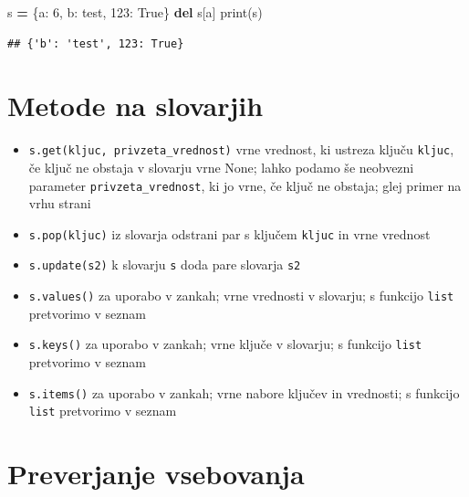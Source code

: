 \documentclass[
]{report}
\newenvironment{Shaded}{\begin{snugshade}}{\end{snugshade}}
\newcommand{\BuiltInTok}[1]{#1}
\newcommand{\DecValTok}[1]{\textcolor[rgb]{0.00,0.00,0.81}{#1}}
\newcommand{\KeywordTok}[1]{\textcolor[rgb]{0.13,0.29,0.53}{\textbf{#1}}}
\newcommand{\NormalTok}[1]{#1}
\newcommand{\OperatorTok}[1]{\textcolor[rgb]{0.81,0.36,0.00}{\textbf{#1}}}
\newcommand{\StringTok}[1]{\textcolor[rgb]{0.31,0.60,0.02}{#1}}
\newcommand{\VariableTok}[1]{\textcolor[rgb]{0.00,0.00,0.00}{#1}}
\providecommand{\tightlist}{%
  \setlength{\itemsep}{0pt}\setlength{\parskip}{0pt}}
\begin{document}
\begin{Shaded}
\begin{Highlighting}[]
\NormalTok{s }\OperatorTok{=}\NormalTok{ \{}\StringTok{\textquotesingle{}a\textquotesingle{}}\NormalTok{: }\DecValTok{6}\NormalTok{, }\StringTok{\textquotesingle{}b\textquotesingle{}}\NormalTok{: }\StringTok{\textquotesingle{}test\textquotesingle{}}\NormalTok{, }\DecValTok{123}\NormalTok{: }\VariableTok{True}\NormalTok{\}}
\KeywordTok{del}\NormalTok{ s[}\StringTok{\textquotesingle{}a\textquotesingle{}}\NormalTok{]}
\BuiltInTok{print}\NormalTok{(s)}
\end{Highlighting}
\end{Shaded}

\begin{verbatim}
## {'b': 'test', 123: True}
\end{verbatim}

\hypertarget{metode-na-slovarjih}{%
\section{Metode na slovarjih}\label{metode-na-slovarjih}}

\begin{itemize}
\tightlist
\item
  \texttt{s.get(kljuc,\ privzeta\_vrednost)} vrne vrednost, ki ustreza ključu \texttt{kljuc}, če ključ ne obstaja v slovarju vrne None; lahko podamo še neobvezni parameter \texttt{privzeta\_vrednost}, ki jo vrne, če ključ ne obstaja; glej primer na vrhu strani
\item
  \texttt{s.pop(kljuc)} iz slovarja odstrani par s ključem \texttt{kljuc} in vrne vrednost
\item
  \texttt{s.update(s2)} k slovarju \texttt{s} doda pare slovarja \texttt{s2}
\item
  \texttt{s.values()} za uporabo v zankah; vrne vrednosti v slovarju; s funkcijo \texttt{list} pretvorimo v seznam
\item
  \texttt{s.keys()} za uporabo v zankah; vrne ključe v slovarju; s funkcijo \texttt{list} pretvorimo v seznam
\item
  \texttt{s.items()} za uporabo v zankah; vrne nabore ključev in vrednosti; s funkcijo \texttt{list} pretvorimo v seznam
\end{itemize}

\hypertarget{preverjanje-vsebovanja-1}{%
\section{Preverjanje vsebovanja}\label{preverjanje-vsebovanja-1}}
\end{document}
